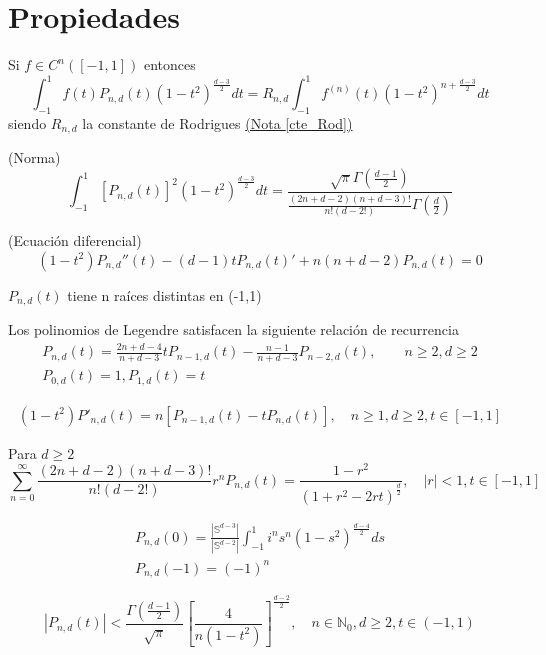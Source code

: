 \section{Propiedades}
\begin{prop}
Si $f\in C^n([-1,1])$ entonces 
$$
\int_{-1}^{1} f(t)P_{n,d}(t)(1-t^2)^{\frac{d-3}{2}} dt = R_{n,d}\int_{-1}^{1} f^{(n)}(t)(1-t^2)^{n+\frac{d-3}{2}} dt
$$
siendo $R_{n,d}$ la constante de Rodrigues \hyperref[]{(Nota \ref{cte_Rod})}
\end{prop}
\begin{prop}(Norma)
	$$ \int_{-1}^{1} \left[P_{n,d}(t)\right]^2(1-t^2)^{\frac{d-3}{2}} dt = \frac{\sqrt{\pi} \Gamma(\frac{d-1}{2})}{\frac{(2n+d-2)(n+d-3)!}{n!(d-2!)}\Gamma(\frac{d}{2})}$$
\end{prop}
\begin{prop}(Ecuación diferencial)
	$$(1-t^2)P_{n,d}''(t) - (d-1)tP_{n,d}(t)'+n(n+d-2)P_{n,d}(t) = 0 $$
\end{prop}
\begin{prop}$P_{n,d}(t)$ tiene n raíces distintas en (-1,1)
\end{prop}
\begin{prop}Los polinomios de Legendre satisfacen la siguiente relación de recurrencia
	\begin{gather*}
		P_{n,d}(t) = \frac{2n+d-4}{n+d-3}t	P_{n-1,d}(t) - \frac{n-1}{n+d-3}P_{n-2,d}(t), \qquad n\ge 2, d\ge2 \\
		P_{0,d}(t) = 1 , 	P_{1,d}(t) = t 
	\end{gather*}
\end{prop}
\begin{prop}
	\begin{gather*}
	(1-t^2)P'_{n,d}(t) = n[P_{n-1,d}(t)-tP_{n,d}(t)], \quad n \ge 1,d \ge 2, t \in [-1,1]
	\end{gather*}
\end{prop}
\begin{prop}Para $d\ge 2$
$$\sum_{n=0}^{\infty} \frac{(2n+d-2)(n+d-3)!}{n!(d-2!)}r^nP_{n,d}(t) = \frac{1-r^2}{(1+r^2-2rt)^\frac{d}{2}},\quad |r| < 1, t\in[-1,1] 
$$
\end{prop}
\begin{prop}
	\begin{gather*}
	P_{n,d}(0) = \frac{|\mathds{S}^{d-3}|}{|\mathds{S}^{d-2}|}\int_{-1}^{1} i^n s^n(1-s^2)^{\frac{d-4}{2}}ds \\
	P_{n,d}(-1) = (-1)^n
	\end{gather*}
\end{prop}
\begin{prop}
	$$
	|P_{n,d}(t)| < \frac{\Gamma(\frac{d-1}{2})}{\sqrt{\pi}}\left[\frac{4}{n(1-t^2)}\right]^{\frac{d-2}{2}},\quad n\in\mathds{N}_0,d\ge2,t\in(-1,1)$$
\end{prop}

